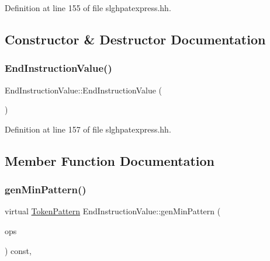 Definition at line 155 of file slghpatexpress.\+hh.



\subsection{Constructor \& Destructor Documentation}
\mbox{\label{class_end_instruction_value_a75d23590dd2d8516547877d3bfbf858b}} 
\subsubsection{\texorpdfstring{EndInstructionValue()}{EndInstructionValue()}}
{\footnotesize\ttfamily End\+Instruction\+Value\+::\+End\+Instruction\+Value (\begin{DoxyParamCaption}\item[{void}]{ }\end{DoxyParamCaption})\hspace{0.3cm}{\ttfamily [inline]}}



Definition at line 157 of file slghpatexpress.\+hh.



\subsection{Member Function Documentation}
\mbox{\label{class_end_instruction_value_a268e8aae070151119c5b253522d35b0e}} 
\subsubsection{\texorpdfstring{genMinPattern()}{genMinPattern()}}
{\footnotesize\ttfamily virtual \mbox{\hyperlink{class_token_pattern}{Token\+Pattern}} End\+Instruction\+Value\+::gen\+Min\+Pattern (\begin{DoxyParamCaption}\item[{const vector$<$ \mbox{\hyperlink{class_token_pattern}{Token\+Pattern}} $>$ \&}]{ops }\end{DoxyParamCaption}) const\hspace{0.3cm}{\ttfamily [inline]}, {\ttfamily [virtual]}}



